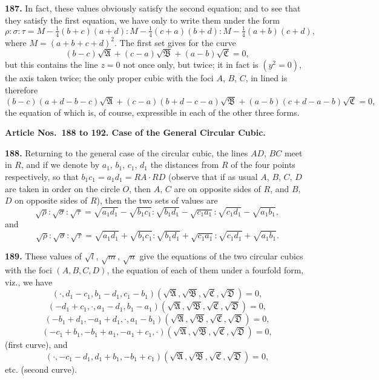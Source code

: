 \documentclass[12pt,a4paper]{article}
\theoremstyle{definition}
\begin{document}
\newpage
\noindent\textbf{187.} In fact, these values obviously satisfy the second equation; and to see that they
satisfy the first equation, we have only to write them under the form
\[
\rho : \sigma : \tau = M - \tfrac{1}{4}(b + c)(a + d) : M - \tfrac{1}{4}(c + a)(b + d) : M - \tfrac{1}{4}(a + b)(c + d),
\]
where $M = (a + b + c + d)^2$. The first set gives for the curve
\[
(b - c)\sqrt{\mathfrak{A}} + (c - a)\sqrt{\mathfrak{B}} + (a - b)\sqrt{\mathfrak{C}} = 0,
\]
but this contains the line $z = 0$ not once only, but twice; it in fact is $(y^2 = 0)$, the
axis taken twice; the only proper cubic with the foci $A$, $B$, $C$, in lined is therefore
\[
(b - c)(a + d - b - c)\sqrt{\mathfrak{A}} + (c - a)(b + d - c - a)\sqrt{\mathfrak{B}} + (a - b)(c + d - a - b)\sqrt{\mathfrak{C}} = 0,
\]
the equation of which is, of course, expressible in each of the other three forms.

\vspace{0.5em}
\noindent\textbf{Article Nos.~188 to 192. Case of the General Circular Cubic.}

\vspace{0.3em}
\noindent\textbf{188.} Returning to the general case of the circular cubic, the lines $AD$, $BC$
meet in $R$, and if we denote by $a_1$, $b_1$, $c_1$, $d_1$ the distances from $R$ of the four points
respectively, so that $b_1c_1 = a_1d_1 = RA \cdot RD$ (observe that if as usual $A$, $B$, $C$, $D$ are
taken in order on the circle $O$, then $A$, $C$ are on opposite sides of $R$, and $B$, $D$ on
opposite sides of $R$), then the two sets of values are
\[
\sqrt{\rho} : \sqrt{\sigma} : \sqrt{\tau} = \sqrt{a_1d_1} - \sqrt{b_1c_1} : \sqrt{b_1d_1} - \sqrt{c_1a_1} : \sqrt{c_1d_1} - \sqrt{a_1b_1},
\]
and
\[
\sqrt{\rho} : \sqrt{\sigma} : \sqrt{\tau} = \sqrt{a_1d_1} + \sqrt{b_1c_1} : \sqrt{b_1d_1} + \sqrt{c_1a_1} : \sqrt{c_1d_1} + \sqrt{a_1b_1}.
\]

\newpage
\noindent\textbf{189.} These values of $\sqrt{l}$, $\sqrt{m}$, $\sqrt{n}$ give the equations of the two circular cubics
with the foci $(A, B, C, D)$, the equation of each of them under a fourfold form,
viz., we have
\[
(\cdot, d_1 - c_1, b_1 - d_1, c_1 - b_1)(\sqrt{\mathfrak{A}}, \sqrt{\mathfrak{B}}, \sqrt{\mathfrak{C}}, \sqrt{\mathfrak{D}}) = 0,
\]
\[
(-d_1 + c_1, \cdot, a_1 - d_1, b_1 - a_1)(\sqrt{\mathfrak{A}}, \sqrt{\mathfrak{B}}, \sqrt{\mathfrak{C}}, \sqrt{\mathfrak{D}}) = 0,
\]
\[
(-b_1 + d_1, -a_1 + d_1, \cdot, a_1 - b_1)(\sqrt{\mathfrak{A}}, \sqrt{\mathfrak{B}}, \sqrt{\mathfrak{C}}, \sqrt{\mathfrak{D}}) = 0,
\]
\[
(-c_1 + b_1, -b_1 + a_1, -a_1 + c_1, \cdot)(\sqrt{\mathfrak{A}}, \sqrt{\mathfrak{B}}, \sqrt{\mathfrak{C}}, \sqrt{\mathfrak{D}}) = 0,
\]
(first curve), and
\[
(\cdot, -c_1 - d_1, d_1 + b_1, -b_1 + c_1)(\sqrt{\mathfrak{A}}, \sqrt{\mathfrak{B}}, \sqrt{\mathfrak{C}}, \sqrt{\mathfrak{D}}) = 0,
\]
etc. (second curve).
\end{document}
